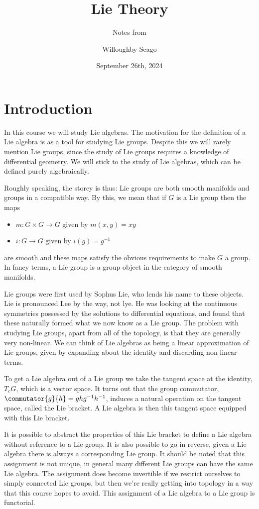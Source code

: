 \documentclass[fleqn]{NotesClass}
\title{Lie Theory}
\author{Willoughby Seago}
\date{September 26th, 2024}
\subtitle{Notes from}
\begin{document}
	\frontmatter
	\titlepage
	\innertitlepage{}
	\tableofcontents
	\mainmatter
	\chapter{Introduction}
	In this course we will study Lie algebras.
	The motivation for the definition of a Lie algebra is as a tool for studying Lie groups.
	Despite this we will rarely mention Lie groups, since the study of Lie groups requires a knowledge of differential geometry.
	We will stick to the study of Lie algebras, which can be defined purely algebraically.
	
	Roughly speaking, the storey is thus: Lie groups are both smooth manifolds and groups in a compatible way.
	By this, we mean that if \(G\) is a Lie group then the maps
	\begin{itemize}
		\item \(m \colon G \times G \to G\) given by \(m(x, y) = xy\)
	    \item \(i \colon G \to G\) given by \(i(g) = g^{-1}\)
	\end{itemize}
	are smooth and these maps satisfy the obvious requirements to make \(G\) a group.
    In fancy terms, a Lie group is a group object in the category of smooth manifolds.
    
    Lie groups were first used by Sophus Lie, who lends his name to these objects.
    Lie is pronounced Lee by the way, not lye.
    He was looking at the continuous symmetries possessed by the solutions to differential equations, and found that these naturally formed what we now know as a Lie group.
    The problem with studying Lie groups, apart from all of the topology, is that they are generally very non-linear.
    We can think of Lie algebras as being a linear approximation of Lie groups, given by expanding about the identity and discarding non-linear terms.
	
	To get a Lie algebra out of a Lie group we take the tangent space at the identity, \(T_eG\), which is a vector space.
	It turns out that the group commutator, \(\commutator{g}{h} = ghg^{-1}h^{-1}\), induces a natural operation on the tangent space, called the Lie bracket.
	A Lie algebra is then this tangent space equipped with this Lie bracket.
	
	It is possible to abstract the properties of this Lie bracket to define a Lie algebra without reference to a Lie group.
	It is also possible to go in reverse, given a Lie algebra there is always a corresponding Lie group.
	It should be noted that this assignment is not unique, in general many different Lie groups can have the same Lie algebra.
	The assignment does become invertible if we restrict ourselves to simply connected Lie groups, but then we're really getting into topology in a way that this course hopes to avoid.
	This assignment of a Lie algebra to a Lie group is functorial.
	
\end{document}
